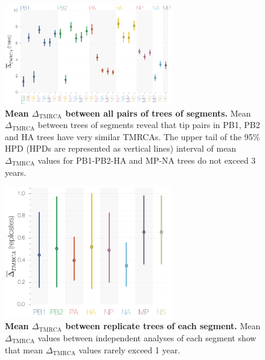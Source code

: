 \documentclass[11pt,oneside,letterpaper]{article}
\newcommand{\dtmrca}{\Delta_\mathrm{TMRCA}}
\begin{document}

\begin{figure}
\centering  
\includegraphics[width=0.65\textwidth]  {supp_figures/InfB_supp_deltaTMRCA_trees.png}
\caption{\textbf{Mean $\dtmrca$ between all pairs of trees of segments.}
Mean $\dtmrca$ between trees of segments reveal that tip pairs in PB1, PB2 and HA trees have very similar TMRCAs.
The upper tail of the 95\% HPD (HPDs are represented as vertical lines) interval of mean $\dtmrca$ values for PB1-PB2-HA and MP-NA trees do not exceed 3 years.}
\label{deltaTMRCAtrees}
\end{figure}

\begin{figure}
\centering  
\includegraphics[width=0.65\textwidth]  {supp_figures/InfB_supp_deltaTMRCA_replicates.png}
\caption{\textbf{Mean $\dtmrca$ between replicate trees of each segment.}
Mean $\dtmrca$ values between independent analyses of each segment show that mean $\dtmrca$ values rarely exceed 1 year.}
\label{deltaTMRCAreplicates}
\end{figure}
\end{document}
